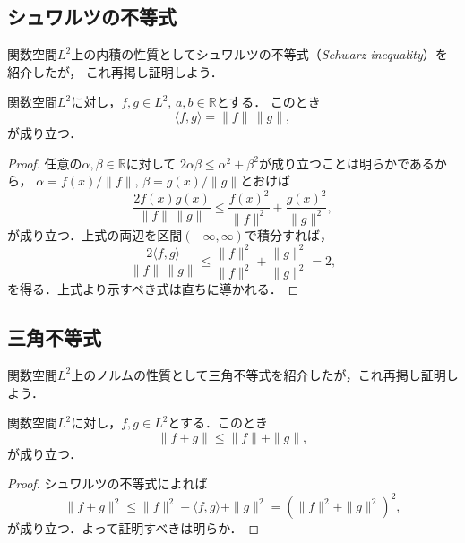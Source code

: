 %

\subsection*{シュワルツの不等式}

関数空間$L^2$上の内積の性質としてシュワルツの不等式（\textit{Schwarz inequality}）を紹介したが，
これ再掲し証明しよう．

\begin{theorem}[シュワルツの不等式]
関数空間$L^2$に対し，$f, g \in L^2$, $a, b \in \mathbb{R}$とする．
このとき
\begin{equation}
\langle f, g \rangle = \| f \| \, \| g \|,
\end{equation}
が成り立つ．
\end{theorem}
\begin{proof}
任意の$\alpha, \beta \in \mathbb{R}$に対して
$2 \alpha \beta \leq \alpha^2 + \beta^2$が成り立つことは明らかであるから，
$\alpha = f(x) / \| f \|$, $\beta = g(x) / \| g \|$とおけば
\begin{equation}
    \frac{2 f(x) g(x)}{\| f \| \, \| g \|}
    \leq \frac{f(x)^2}{\| f \|^2} + \frac{g(x)^2}{\| g \|^2},
\end{equation}
が成り立つ．上式の両辺を区間$(-\infty, \infty)$で積分すれば，
\begin{equation}
    \frac{2 \langle f, g \rangle}{\| f \| \, \| g \|}
    \leq \frac{\| f \|^2}{\| f \|^2} + \frac{\| g \|^2}{\| g \|^2} = 2,
\end{equation}
を得る．上式より示すべき式は直ちに導かれる．
\end{proof}


\subsection*{三角不等式}

関数空間$L^2$上のノルムの性質として三角不等式を紹介したが，これ再掲し証明しよう．

\begin{theorem}[三角不等式]
関数空間$L^2$に対し，$f, g \in L^2$とする．このとき
\begin{equation}
    \| f + g \| \leq \| f \| + \| g \|,
\end{equation}
が成り立つ．
\end{theorem}
\begin{proof}
シュワルツの不等式によれば
\begin{equation}
\| f + g \|^2
\leq \| f \|^2 + \langle f, g \rangle + \| g \|^2
= \left( \| f \|^2 + \| g \|^2 \right)^2,
\end{equation}
が成り立つ．よって証明すべきは明らか．
\end{proof}

